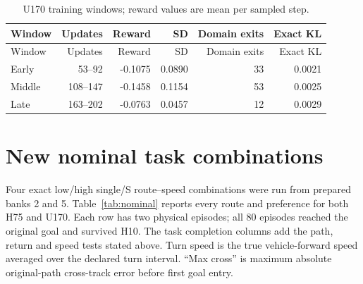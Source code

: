 \documentclass[11pt,a4paper]{article}
\begin{document}
\begin{longtable}{lrrrrr}
\caption{U170 training windows; reward values are mean per sampled step.}\\
\toprule
Window & Updates & Reward & SD & Domain exits & Exact KL \\
\midrule
\endfirsthead
\toprule
Window & Updates & Reward & SD & Domain exits & Exact KL \\
\midrule
\endhead
Early & 53--92 & -0.1075 & 0.0890 & 33 & 0.0021 \\
Middle & 108--147 & -0.1458 & 0.1154 & 53 & 0.0025 \\
Late & 163--202 & -0.0763 & 0.0457 & 12 & 0.0029 \\
\bottomrule
\end{longtable}

\section{New nominal task combinations}
Four exact low/high single/S route--speed combinations were run from prepared banks 2 and 5. Table~\ref{tab:nominal} reports every route and preference for both H75 and U170. Each row has two physical episodes; all 80 episodes reached the original goal and survived H10. The task completion columns add the path, return and speed tests stated above. Turn speed is the true vehicle-forward speed averaged over the declared turn interval. ``Max cross'' is maximum absolute original-path cross-track error before first goal entry.
\end{document}
